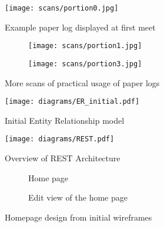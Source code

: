 \documentclass[../main.tex]{subfiles}
\begin{document}
\begin{figure}
    \centering
    \texttt{[image: scans/portion0.jpg]}
    \caption{Example paper log displayed at first meet}%
\end{figure}

\begin{figure}
    \centering
    \noindent\begin{subfigure}{.49\textwidth}
    \texttt{[image: scans/portion1.jpg]}
    \end{subfigure}\hfill
    \begin{subfigure}{.49\textwidth}
    \texttt{[image: scans/portion3.jpg]}
    \end{subfigure}
    \caption{More scans of practical usage of paper logs}%
\end{figure}

\begin{figure}
    \centering
    \texttt{[image: diagrams/ER\_initial.pdf]}
    \caption{Initial Entity Relationship model}%
\end{figure}

\begin{figure}
    \centering
    \texttt{[image: diagrams/REST.pdf]}
    \caption{Overview of REST Architecture}%
\end{figure}

\begin{figure}
    \centering
    \noindent\begin{subfigure}{.48\textwidth}
    \centering
    \caption{Home page}
    \end{subfigure}\hfill
    \begin{subfigure}{.48\textwidth}
    \centering
    \caption{Edit view of the home page}
    \end{subfigure}
    \caption{Homepage design from initial wireframes}%
\end{figure}
\end{document}
